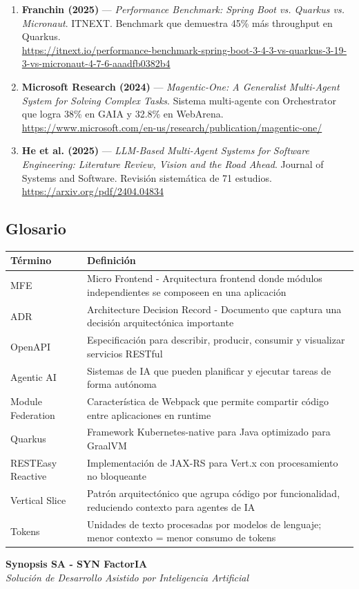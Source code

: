 \documentclass[12pt,a4paper,spanish]{article}
\begin{document}
\begin{enumerate}
\item \textbf{Franchin (2025)} --- \textit{Performance Benchmark: Spring Boot vs. Quarkus vs. Micronaut}. ITNEXT. Benchmark que demuestra 45\% más throughput en Quarkus.\\
\url{https://itnext.io/performance-benchmark-spring-boot-3-4-3-vs-quarkus-3-19-3-vs-micronaut-4-7-6-aaadfb0382b4}

\item \textbf{Microsoft Research (2024)} --- \textit{Magentic-One: A Generalist Multi-Agent System for Solving Complex Tasks}. Sistema multi-agente con Orchestrator que logra 38\% en GAIA y 32.8\% en WebArena.\\
\url{https://www.microsoft.com/en-us/research/publication/magentic-one/}

\item \textbf{He et al. (2025)} --- \textit{LLM-Based Multi-Agent Systems for Software Engineering: Literature Review, Vision and the Road Ahead}. Journal of Systems and Software. Revisión sistemática de 71 estudios.\\
\url{https://arxiv.org/pdf/2404.04834}

\end{enumerate}

\subsection{Glosario}

\begin{tabular}{p{3cm}p{10cm}}
\textbf{Término} & \textbf{Definición} \\
\midrule
MFE & Micro Frontend - Arquitectura frontend donde módulos independientes se composeen en una aplicación \\
\midrule
ADR & Architecture Decision Record - Documento que captura una decisión arquitectónica importante \\
\midrule
OpenAPI & Especificación para describir, producir, consumir y visualizar servicios RESTful \\
\midrule
Agentic AI & Sistemas de IA que pueden planificar y ejecutar tareas de forma autónoma \\
\midrule
Module Federation & Característica de Webpack que permite compartir código entre aplicaciones en runtime \\
\midrule
Quarkus & Framework Kubernetes-native para Java optimizado para GraalVM \\
\midrule
RESTEasy Reactive & Implementación de JAX-RS para Vert.x con procesamiento no bloqueante \\
\midrule
Vertical Slice & Patrón arquitectónico que agrupa código por funcionalidad, reduciendo contexto para agentes de IA \\
\midrule
Tokens & Unidades de texto procesadas por modelos de lenguaje; menor contexto = menor consumo de tokens \\
\end{tabular}

\vfill

\begin{center}
\textbf{Synopsis SA - SYN FactorIA}
\\
\textit{Solución de Desarrollo Asistido por Inteligencia Artificial}
\\
\end{center}
\end{document}
